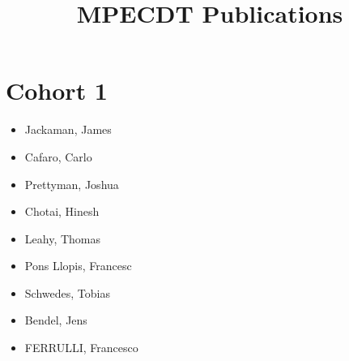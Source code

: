 \documentclass{article}
\title{MPECDT Publications}
\author{}
\date{}
\begin{document}
\maketitle
\section*{Cohort 1}
\begin{itemize}
    \item Jackaman, James \cite{jackaman2019design}
    \item Cafaro, Carlo \cite{cafaro2019added, cafaro2018characteristics}
    \item Prettyman, Joshua \cite{prettyman2018novel, prettyman2019generalized}
    \item Chotai, Hinesh \cite{chassagneux2017forward, chassagneux2017introduction, chassagneux2017mathematical, chassagneux2017description, chassagneux2017numerical,chassagneux2017case}
    \item Leahy, Thomas \cite{leahy2018using}
    \item Pons Llopis, Francesc \cite{llopis2018particle,leahy2018using}
    \item Schwedes, Tobias \cite{schwedes2017mesh,schwedes2017introduction, schwedes2017application}
    \item Bendel, Jens
    \item FERRULLI, Francesco \cite{safronov2019eigenvalues}
\end{itemize}
\end{document}
